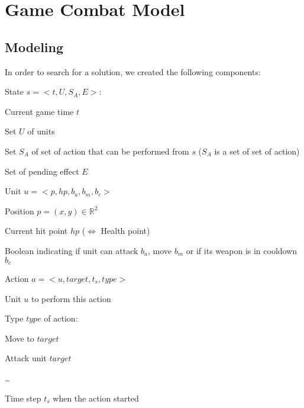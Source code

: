 \section{Game Combat Model}

\subsection{Modeling}

In order to search for a solution, we created the following components:

\begin{descri}
\item[State] $s=<t,U,S_A,E>$:
\begin{shortitem}
\item Current game time $t$
\item Set $U$ of units  
\item Set $S_A$ of set of action that can be performed from $s$ ($S_A$ is a set of set of action)
\item Set of pending effect $E$ 
\end{shortitem}

\item[Unit] $u = <p,hp,b_a,b_m,b_c>$
\begin{shortitem}
\item Position $p = (x,y) \in \mathbb{R}^2$
\item Current hit point $hp$ ($\Leftrightarrow$ Health point)
\item Boolean indicating if unit can attack $b_a$, move $b_m$ or if its weapon is in cooldown $b_c$
\end{shortitem}

\item[Action] $a=<u,target,t_s,type>$
\begin{shortitem}
\item Unit $u$ to perform this action
\item Type $type$ of action:
    \begin{shortitem}
    \item Move to $target$
    \item Attack unit $target$
    \item \dots
    \end{shortitem}
    \item Time step $t_s$ when the action started
\end{shortitem}


\end{descri}
